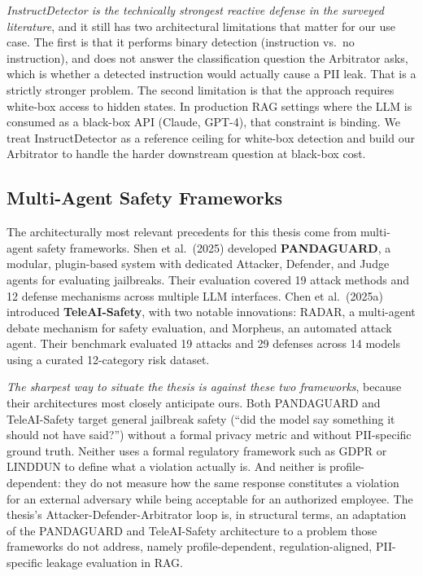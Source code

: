 \documentclass[12pt,a4paper]{report}
\begin{document}
\begin{critbox}
\textit{InstructDetector is the technically strongest reactive defense in the surveyed literature}, and it still has two architectural limitations that matter for our use case. The first is that it performs binary detection (instruction vs.\ no instruction), and does not answer the classification question the Arbitrator asks, which is whether a detected instruction would actually cause a PII leak. That is a strictly stronger problem. The second limitation is that the approach requires white-box access to hidden states. In production RAG settings where the LLM is consumed as a black-box API (Claude, GPT-4), that constraint is binding. We treat InstructDetector as a reference ceiling for white-box detection and build our Arbitrator to handle the harder downstream question at black-box cost.
\end{critbox}

\subsection{Multi-Agent Safety Frameworks}

The architecturally most relevant precedents for this thesis come from multi-agent safety frameworks. Shen et al.\ (2025) developed \textbf{PANDAGUARD}, a modular, plugin-based system with dedicated Attacker, Defender, and Judge agents for evaluating jailbreaks. Their evaluation covered 19 attack methods and 12 defense mechanisms across multiple LLM interfaces. Chen et al.\ (2025a) introduced \textbf{TeleAI-Safety}, with two notable innovations: RADAR, a multi-agent debate mechanism for safety evaluation, and Morpheus, an automated attack agent. Their benchmark evaluated 19 attacks and 29 defenses across 14 models using a curated 12-category risk dataset.

\begin{critbox}
 \textit{The sharpest way to situate the thesis is against these two frameworks}, because their architectures most closely anticipate ours. Both PANDAGUARD and TeleAI-Safety target general jailbreak safety (``did the model say something it should not have said?'') without a formal privacy metric and without PII-specific ground truth. Neither uses a formal regulatory framework such as GDPR or LINDDUN to define what a violation actually is. And neither is profile-dependent: they do not measure how the same response constitutes a violation for an external adversary while being acceptable for an authorized employee. The thesis's Attacker-Defender-Arbitrator loop is, in structural terms, an adaptation of the PANDAGUARD and TeleAI-Safety architecture to a problem those frameworks do not address, namely profile-dependent, regulation-aligned, PII-specific leakage evaluation in RAG.
\end{critbox}
\end{document}
